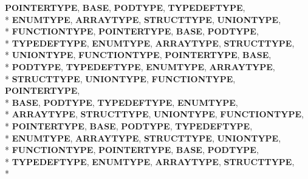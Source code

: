 \begin{DoxyCompactItemize}
{\bfseries P\-O\-I\-N\-T\-E\-R\-T\-Y\-P\-E}, 
{\bfseries B\-A\-S\-E}, 
{\bfseries P\-O\-D\-T\-Y\-P\-E}, 
{\bfseries T\-Y\-P\-E\-D\-E\-F\-T\-Y\-P\-E}, 
\\*
{\bfseries E\-N\-U\-M\-T\-Y\-P\-E}, 
{\bfseries A\-R\-R\-A\-Y\-T\-Y\-P\-E}, 
{\bfseries S\-T\-R\-U\-C\-T\-T\-Y\-P\-E}, 
{\bfseries U\-N\-I\-O\-N\-T\-Y\-P\-E}, 
\\*
{\bfseries F\-U\-N\-C\-T\-I\-O\-N\-T\-Y\-P\-E}, 
{\bfseries P\-O\-I\-N\-T\-E\-R\-T\-Y\-P\-E}, 
{\bfseries B\-A\-S\-E}, 
{\bfseries P\-O\-D\-T\-Y\-P\-E}, 
\\*
{\bfseries T\-Y\-P\-E\-D\-E\-F\-T\-Y\-P\-E}, 
{\bfseries E\-N\-U\-M\-T\-Y\-P\-E}, 
{\bfseries A\-R\-R\-A\-Y\-T\-Y\-P\-E}, 
{\bfseries S\-T\-R\-U\-C\-T\-T\-Y\-P\-E}, 
\\*
{\bfseries U\-N\-I\-O\-N\-T\-Y\-P\-E}, 
{\bfseries F\-U\-N\-C\-T\-I\-O\-N\-T\-Y\-P\-E}, 
{\bfseries P\-O\-I\-N\-T\-E\-R\-T\-Y\-P\-E}, 
{\bfseries B\-A\-S\-E}, 
\\*
{\bfseries P\-O\-D\-T\-Y\-P\-E}, 
{\bfseries T\-Y\-P\-E\-D\-E\-F\-T\-Y\-P\-E}, 
{\bfseries E\-N\-U\-M\-T\-Y\-P\-E}, 
{\bfseries A\-R\-R\-A\-Y\-T\-Y\-P\-E}, 
\\*
{\bfseries S\-T\-R\-U\-C\-T\-T\-Y\-P\-E}, 
{\bfseries U\-N\-I\-O\-N\-T\-Y\-P\-E}, 
{\bfseries F\-U\-N\-C\-T\-I\-O\-N\-T\-Y\-P\-E}, 
{\bfseries P\-O\-I\-N\-T\-E\-R\-T\-Y\-P\-E}, 
\\*
{\bfseries B\-A\-S\-E}, 
{\bfseries P\-O\-D\-T\-Y\-P\-E}, 
{\bfseries T\-Y\-P\-E\-D\-E\-F\-T\-Y\-P\-E}, 
{\bfseries E\-N\-U\-M\-T\-Y\-P\-E}, 
\\*
{\bfseries A\-R\-R\-A\-Y\-T\-Y\-P\-E}, 
{\bfseries S\-T\-R\-U\-C\-T\-T\-Y\-P\-E}, 
{\bfseries U\-N\-I\-O\-N\-T\-Y\-P\-E}, 
{\bfseries F\-U\-N\-C\-T\-I\-O\-N\-T\-Y\-P\-E}, 
\\*
{\bfseries P\-O\-I\-N\-T\-E\-R\-T\-Y\-P\-E}, 
{\bfseries B\-A\-S\-E}, 
{\bfseries P\-O\-D\-T\-Y\-P\-E}, 
{\bfseries T\-Y\-P\-E\-D\-E\-F\-T\-Y\-P\-E}, 
\\*
{\bfseries E\-N\-U\-M\-T\-Y\-P\-E}, 
{\bfseries A\-R\-R\-A\-Y\-T\-Y\-P\-E}, 
{\bfseries S\-T\-R\-U\-C\-T\-T\-Y\-P\-E}, 
{\bfseries U\-N\-I\-O\-N\-T\-Y\-P\-E}, 
\\*
{\bfseries F\-U\-N\-C\-T\-I\-O\-N\-T\-Y\-P\-E}, 
{\bfseries P\-O\-I\-N\-T\-E\-R\-T\-Y\-P\-E}, 
{\bfseries B\-A\-S\-E}, 
{\bfseries P\-O\-D\-T\-Y\-P\-E}, 
\\*
{\bfseries T\-Y\-P\-E\-D\-E\-F\-T\-Y\-P\-E}, 
{\bfseries E\-N\-U\-M\-T\-Y\-P\-E}, 
{\bfseries A\-R\-R\-A\-Y\-T\-Y\-P\-E}, 
{\bfseries S\-T\-R\-U\-C\-T\-T\-Y\-P\-E}, 
\\*

\end{DoxyCompactItemize}
